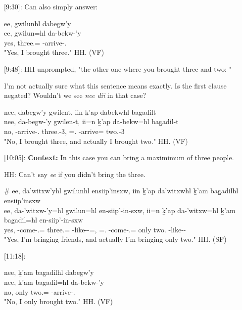 [9:30]: Can also simply answer:

\begin{exe}
    \ex \glll
    ee, gwilunhl dabegw'y\\
    ee, gwilun=hl da-bekw-'y\\
    yes, three.\Hum{}=\Cn{} \Com{}-arrive-\Fsg{}.\Ii{} \\
    \glt "Yes, I brought three." \hfill HH.\ElicitationDate{} (VF)
\end{exe}

[9:48]: HH unprompted, "the other one where you brought three and two: "

I'm not actually sure what this sentence means exactly. Is the first clause negated? Wouldn't we see \textit{nee dii} in that case?

\begin{exe}
    \ex \glll
    nee, dabegw'y gwilent, iin ḵ'ap dabekwhl bag̱adilt \\
    nee, da-begw-'y gwilen-t, ii=n ḵ'ap da-bekw=hl bag̱adil-t  \\
    no, \Com{}-arrive-\Fsg{}.\Ii{} three.\Hum{}-3, \Ccnj{}=\Fsg{}.\I{} \Com{}-arrive=\Cn{} two.\Hum{}-3 \\
    \glt "No, I brought three, and actually I brought two." \hfill HH.\ElicitationDate{} (VF)
\end{exe}

[10:05]: \textbf{Context: }In this case you can bring a maximimum of three people.

HH: Can't say \textit{ee} if you didn't bring the three.

\begin{exe}
    \ex \glll
    \# ee, da'witxw'yhl gwilunhl ensiip'insxw, iin ḵ'ap da'witxwhl ḵ'am bag̱adilhl ensiip'insxw  \\
    {} ee, da-'witxw-'y=hl gwilun=hl en-siip'-in-sxw, ii=n ḵ'ap da-'witxw=hl ḵ'am bag̱adil=hl en-siip'-in-sxw\\
    {} yes, \Com{}-come-\Fsg{}.\Ii{}=\Cn{} three.\Hum{}=\Cn{} \Nmlz{}-like--\Antip{}=\Q{}, \Ccnj{}=\Fsg{}.\I{} \Verum{} \Com{}-come-\Fsg{}.\Ii{}=\Cn{} only two.\Hum{} \Nmlz{}-like--\Antip{} \\
    \glt "Yes, I'm bringing friends, and actually I'm bringing only two." \hfill HH.\ElicitationDate{} (SF)
\end{exe}

[11:18]:

\begin{exe}
    \ex \glll
    nee, ḵ'am bag̱adilhl dabegw'y \\
    nee, ḵ'am bag̱adil=hl da-bekw-'y \\
    no, only two.\Hum{}=\Cn{} \Com{}-arrive-\Fsg{}.\Ii{} \\
    \glt "No, I only brought two." \hfill HH.\ElicitationDate{} (VF)
\end{exe}


